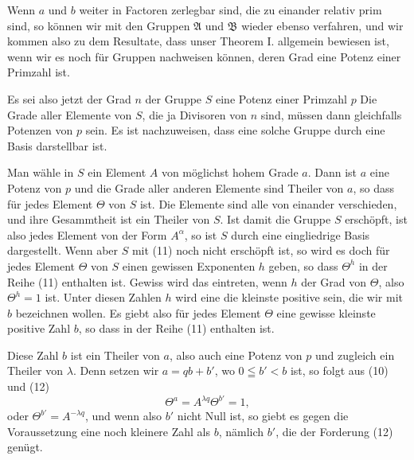 Wenn $a$ und $b$ weiter in Factoren zerlegbar sind, die zu einander relativ prim sind, so können wir mit den Gruppen $\mathfrak{A}$ und $\mathfrak{B}$ wieder ebenso verfahren, und wir kommen also zu dem Resultate, dass unser Theorem I. allgemein bewiesen ist, wenn wir es noch für Gruppen nachweisen können, deren Grad eine Potenz einer Primzahl ist.

Es sei also jetzt der Grad $n$ der Gruppe $S$ eine Potenz einer Primzahl $p$
Die Grade aller Elemente von $S$, die ja Divisoren von $n$ sind, müssen dann gleichfalls Potenzen von $p$ sein. Es ist nachzuweisen, dass eine solche Gruppe durch eine Basis darstellbar ist.

Man wähle in $S$ ein Element $A$ von möglichst hohem Grade $a$. Dann ist $a$ eine Potenz von $p$ und die Grade aller anderen Elemente sind Theiler von $a$, so dass für jedes Element $\Theta$ von $S$
ist. Die Elemente
sind alle von einander verschieden, und ihre Gesammtheit ist ein Theiler von $S$. Ist damit die Gruppe $S$ erschöpft, ist also jedes Element von der Form $A^\alpha$, so ist $S$ durch eine eingliedrige Basis dargestellt. Wenn aber $S$ mit (11) noch nicht erschöpft ist, so wird es doch für jedes Element $\Theta$ von $S$ einen gewissen Exponenten $h$ geben, so dass $\Theta^h$ in der Reihe (11) enthalten ist. Gewiss wird das eintreten, wenn $h$ der Grad von $\Theta$, also $\Theta^h = 1$ ist. Unter diesen Zahlen $h$ wird eine die kleinste positive sein, die wir mit $b$ bezeichnen wollen. Es giebt also für jedes Element $\Theta$ eine gewisse kleinste positive Zahl $b$, so dass
in der Reihe (11) enthalten ist.

Diese Zahl $b$ ist ein Theiler von $a$, also auch eine Potenz von $p$ und zugleich ein Theiler von $\lambda$. Denn setzen wir $a = qb + b'$, wo $0 \leqq b' < b$ ist, so folgt aus (10) und (12)
\[
\Theta^a = A^{\lambda q} \Theta^{b'} = 1,
\]
oder $\Theta^{b'} = A^{-\lambda q}$, und wenn also $b'$ nicht Null ist, so giebt es gegen die Voraussetzung eine noch kleinere Zahl als $b$, nämlich $b'$, die der Forderung (12) genügt.
